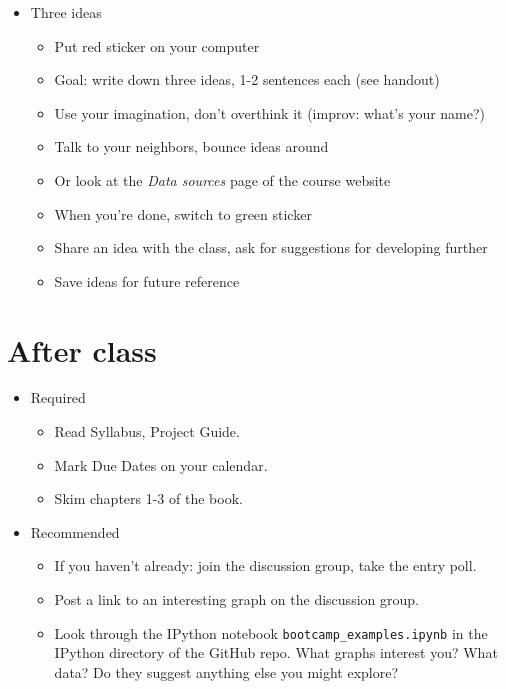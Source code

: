 \documentclass[11pt]{article}
\begin{document}
\begin{itemize}
\item Three ideas
\begin{itemize}
\item Put red sticker on your computer
\item Goal:  write down three ideas, 1-2 sentences each (see handout)
\item Use your imagination, don't overthink it (improv: what's your name?)
\item Talk to your neighbors, bounce ideas around
\item Or look at the {\it Data sources\/} page of the course website
\item When you're done, switch to green sticker
\item Share an idea with the class, ask for suggestions for developing further
\item Save ideas for future reference
\end{itemize}
\end{itemize}


\section*{After class}

\begin{itemize}
\item Required
\begin{itemize}
\item Read Syllabus, Project Guide.
\item Mark Due Dates on your calendar.
\item Skim chapters 1-3 of the book.
\end{itemize}
\item Recommended
\begin{itemize}
\item If you haven't already:  join the discussion group, take the entry poll.
\item Post a link to an interesting graph on the discussion group.
\item Look through the IPython notebook \verb|bootcamp_examples.ipynb|
in the IPython directory of the GitHub repo.
What graphs interest you?  What data?
Do they suggest anything else you might explore?
\end{itemize}
\end{itemize}
\end{document}
